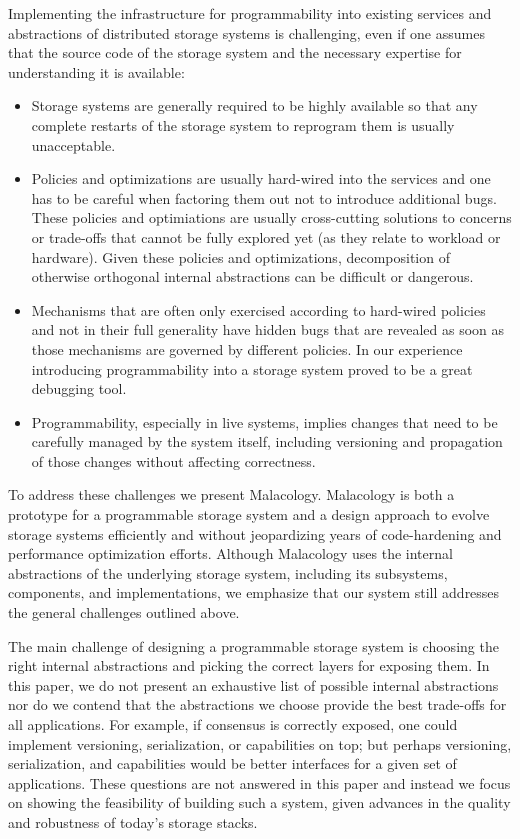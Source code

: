 \documentclass[preprint]{sigplanconf-eurosys}
\begin{document}
Implementing the infrastructure for programmability into existing services and
abstractions of distributed storage systems is challenging, even if one assumes
that the source code of the storage system and the necessary expertise for
understanding it is available:

\begin{itemize}
	
\item Storage systems are generally required to be highly available so that any
complete restarts of the storage system to reprogram them is usually
unacceptable. 

\item Policies and optimizations are usually hard-wired into the services and
one has to be careful when factoring them out not to introduce additional bugs.
These policies and optimiations are usually cross-cutting solutions to concerns
or trade-offs that cannot be fully explored yet (as they relate to workload or
hardware). Given these policies and optimizations, decomposition of otherwise
orthogonal internal abstractions can be difficult or dangerous.

\item Mechanisms that are often only exercised according to hard-wired policies and
not in their full generality have hidden bugs that are revealed as soon as
those mechanisms are governed by different policies. In our experience
introducing programmability into a storage system proved to be a great
debugging tool.

\item Programmability, especially in live systems, implies changes that need to
be carefully managed by the system itself, including versioning and propagation
of those changes without affecting correctness.

\end{itemize}

To address these challenges we present Malacology. Malacology is both a
prototype for a programmable storage system and a design approach to evolve
storage systems efficiently and without jeopardizing years of code-hardening
and performance optimization efforts.  Although Malacology uses
the internal abstractions of the underlying storage system, including its
subsystems, components, and implementations, we emphasize that our system
still addresses the general challenges outlined above.

The main challenge of designing a programmable storage system is choosing the
right internal abstractions and picking the correct layers for exposing them.
In this paper, we do not present an exhaustive list of possible internal
abstractions nor do we contend that the abstractions we choose provide the best
trade-offs for all applications. For example, if consensus is correctly
exposed, one could implement versioning, serialization, or capabilities on top;
but perhaps versioning, serialization, and capabilities would be better
interfaces for a given set of applications. These questions are not answered in
this paper and instead we focus on showing the feasibility of building such a
system, given advances in the quality and robustness of today's storage stacks.
\end{document}
